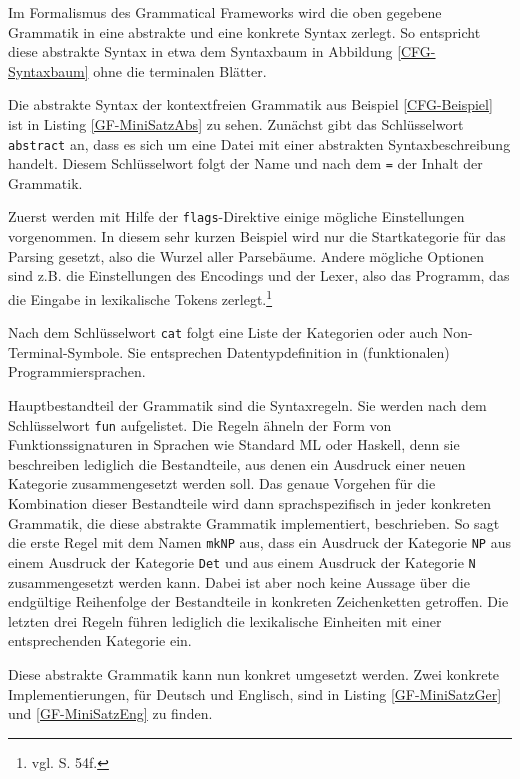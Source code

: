 Im Formalismus des Grammatical Frameworks wird die oben gegebene Grammatik in eine abstrakte und eine konkrete Syntax zerlegt. So entspricht diese abstrakte Syntax in etwa dem Syntaxbaum in Abbildung \ref{CFG-Syntaxbaum} ohne die terminalen Blätter. \par

Die abstrakte Syntax der kontextfreien Grammatik aus Beispiel \ref{CFG-Beispiel} ist in Listing \ref{GF-MiniSatzAbs} zu sehen. Zunächst gibt das Schlüsselwort \texttt{abstract} an, dass es sich um eine Datei mit einer abstrakten Syntaxbeschreibung handelt. Diesem Schlüsselwort folgt der Name und nach dem \texttt{=} der Inhalt der Grammatik. \par
Zuerst werden mit Hilfe der \texttt{flags}-Direktive einige mögliche Einstellungen vorgenommen. In diesem sehr kurzen Beispiel wird nur die Startkategorie für das Parsing gesetzt, also die Wurzel aller Parsebäume. Andere mögliche Optionen sind z.B. die Einstellungen des Encodings und der Lexer, also das Programm, das die Eingabe in lexikalische Tokens zerlegt.\footnote{vgl. \cite{RANTA2011} S. 54f.} \par
Nach dem Schlüsselwort \texttt{cat} folgt eine Liste der Kategorien oder auch Non-Terminal-Symbole. Sie entsprechen Datentypdefinition in (funktionalen) Programmiersprachen. \par
Hauptbestandteil der Grammatik sind die Syntaxregeln. Sie werden nach dem Schlüsselwort \texttt{fun} aufgelistet. Die Regeln ähneln der Form von Funktionssignaturen in Sprachen wie Standard ML oder Haskell, denn sie beschreiben lediglich die Bestandteile, aus denen ein Ausdruck einer neuen Kategorie zusammengesetzt werden soll. Das genaue Vorgehen für die Kombination dieser Bestandteile wird dann sprachspezifisch in jeder konkreten Grammatik, die diese abstrakte Grammatik implementiert, beschrieben. So sagt die erste Regel mit dem Namen \texttt{mkNP} aus, dass ein Ausdruck der Kategorie \texttt{NP} aus einem Ausdruck der Kategorie \texttt{Det} und aus einem Ausdruck der Kategorie \texttt{N} zusammengesetzt werden kann. Dabei ist aber noch keine Aussage über die endgültige Reihenfolge der Bestandteile in konkreten Zeichenketten getroffen. Die letzten drei Regeln führen lediglich die lexikalische Einheiten mit einer entsprechenden Kategorie ein. \par
Diese abstrakte Grammatik kann nun konkret umgesetzt werden. Zwei konkrete Implementierungen, für Deutsch und Englisch, sind in Listing \ref{GF-MiniSatzGer} und \ref{GF-MiniSatzEng} zu finden. \par
